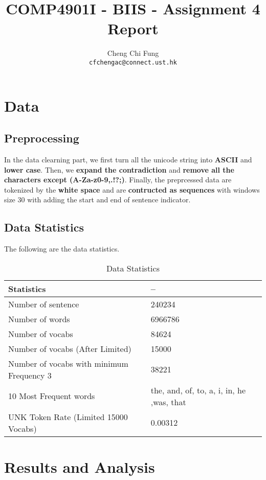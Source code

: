 \documentclass{article}
\title{COMP4901I - BIIS - Assignment 4 Report}
\author{%
	Cheng Chi Fung \\
	\texttt{cfchengac@connect.ust.hk} \\
}
\begin{document}
\maketitle

\section{Data}

\subsection{Preprocessing}

In the data clearning part, we first turn all the unicode string into \textbf{ASCII} and \textbf{lower case}. Then, we \textbf{expand the contradiction} and \textbf{remove all the characters except (A-Za-z0-9,.!?;)}. Finally, the preprcessed data are tokenized by the \textbf{white space} and are  \textbf{contructed as sequences} with windows size 30 with adding the start and end of sentence indicator.

\subsection{Data Statistics}
The following are the data statistics.

\begin{table}[htb]
	\caption{Data Statistics}
	\label{sample-table}
	\centering
	\begin{tabular}{ll}
		\toprule
		\cmidrule{1-2}
		Statistics & --  \\
		\midrule
		Number of sentence & 240234 \\
		Number of words & 6966786  \\
		Number of vocabs & 84624 \\
		Number of vocabs (After Limited) & 15000 \\
		Number of vocabs with minimum Frequency 3 & 38221 \\
		10 Most Frequent words & the, and, of, to, a, i, in, he ,was, that \\
		UNK Token Rate (Limited 15000 Vocabs) & 0.00312 \\
		\bottomrule
	\end{tabular}
\end{table}

\section{Results and Analysis}
\end{document}
